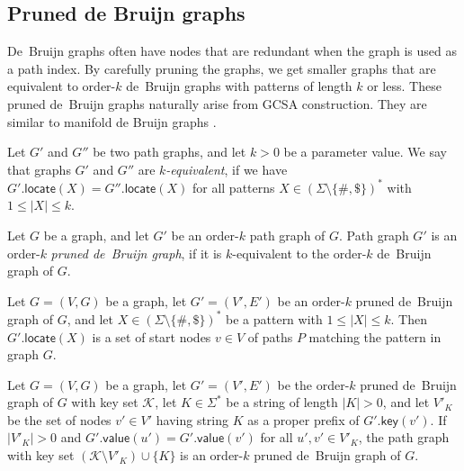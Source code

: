\documentclass[a4paper,11pt]{llncs}
\newcommand{\set}[1]{\ensuremath{\{ #1 \}}}
\newcommand{\abs}[1]{\ensuremath{\lvert #1 \rvert}}
\newcommand{\locate}{\ensuremath{\mathsf{locate}}}
\newcommand{\gkey}{\ensuremath{\mathsf{key}}}
\newcommand{\gvalue}{\ensuremath{\mathsf{value}}}
\newcommand{\kequivalent}[1]{$#1$\nobreakdash-equivalent}
\newcommand{\orderk}[1]{order\nobreakdash-$#1$}
\newcommand{\patternset}{\ensuremath{(\Sigma \setminus \set{\#, \$})^{\ast}}}
\begin{document}
\subsection{Pruned de Bruijn graphs}

De~Bruijn graphs often have nodes that are redundant when the graph is used as a path index. By carefully pruning the graphs, we get smaller graphs that are equivalent to \orderk{k} de~Bruijn graphs with patterns of length $k$ or less. These pruned de~Bruijn graphs naturally arise from GCSA construction. They are similar to manifold de Bruijn graphs \cite{Lin2014}.

\begin{definition}
Let $G'$ and $G''$ be two path graphs, and let $k > 0$ be a parameter value. We say that graphs $G'$ and $G''$ are \emph{\kequivalent{k}}, if we have $G'.\locate(X) = G''.\locate(X)$ for all patterns $X \in \patternset$ with $1 \le \abs{X} \le k$.
\end{definition}

\begin{definition}
Let $G$ be a graph, and let $G'$ be an \orderk{k} path graph of $G$. Path graph $G'$ is an \orderk{k} \emph{pruned de~Bruijn graph}, if it is \kequivalent{k} to the \orderk{k} de~Bruijn graph of $G$.
\end{definition}

\begin{lemma}\label{lemma:dbg-fp}
Let $G = (V, G)$ be a graph, let $G' = (V', E')$ be an \orderk{k} pruned de~Bruijn graph of $G$, and let $X \in \patternset$ be a pattern with $1 \le \abs{X} \le k$. Then $G'.\locate(X)$ is a set of start nodes $v\in V$ of paths $P$ matching the pattern in graph $G$.
\end{lemma}

\begin{lemma}[Pruning]\label{lemma:dbg-prune}
Let $G = (V, G)$ be a graph, let $G' = (V', E')$ be the \orderk{k} pruned de~Bruijn graph of $G$ with key set $\mathcal{K}$, let $K \in \Sigma^{\ast}$ be a string of length $\abs{K} > 0$, and let $V'_{K}$ be the set of nodes $v' \in V'$ having string $K$ as a proper prefix of $G'.\gkey(v')$.
If $\abs{V'_{K}} > 0$ and $G'.\gvalue(u') = G'.\gvalue(v')$ for all $u', v' \in V'_{K}$, the path graph with key set $(\mathcal{K} \setminus V'_{K}) \cup \set{K}$ is an \orderk{k} pruned de~Bruijn graph of $G$.
\end{lemma}
\end{document}
